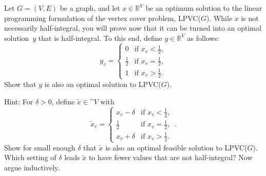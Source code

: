 \begin{exercise}[\hard]
  Let $G = (V, E)$ be a graph, and let $x \in \mathbb R^V$ be an
  optimum solution to the linear programming formulation of the vertex cover problem, LPVC($G$). While $x$ is not necessarily half-integral, you will prove now that it can be turned into an optimal solution~$y$ that is half-integral. To this end, define
  $y\in\mathbb R^V$ as follows:
  \[
  y_v = \begin{cases}
  0 & \text{if } x_v < \frac{1}{2}, \\
  \frac{1}{2} & \text{if } x_v = \frac{1}{2}, \\
  1 & \text{if } x_v > \frac{1}{2}.
  \end{cases}
  \]
  Show that $y$ is also an optimal solution to LPVC($G$).

  Hint: For $\delta>0$, define $\tilde x\in\mathbb^V$ with\[
    \tilde x_v = \begin{cases}
    x_v-\delta & \text{if } x_v < \frac{1}{2}, \\
    \frac{1}{2} & \text{if } x_v = \frac{1}{2}, \\
    x_v+\delta & \text{if } x_v > \frac{1}{2}.
    \end{cases}\,.
    \]
    Show for small enough $\delta$ that $\tilde x$ is also an optimal feasible solution to LPVC($G$). Which setting of $\delta$ leads $\tilde x$ to have fewer values that are not half-integral? Now argue inductively.
\end{exercise}